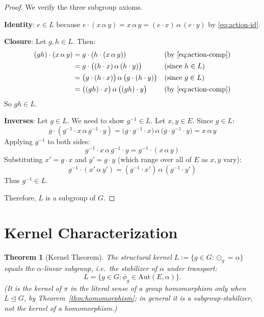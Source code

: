 \documentclass[11pt,a4paper,openany]{book}
\theoremstyle{plain}
\newtheorem{theorem}{Theorem}[chapter]
\theoremstyle{definition}
\newcommand{\twing}[1]{\odot_{#1}}
\newcommand{\lingroup}{L}
\newcommand{\actspace}{E}
\newcommand{\groupG}{G}
\newcommand{\Aut}{\mathrm{Aut}}
\begin{document}
\begin{proof}
We verify the three subgroup axioms.

\textbf{Identity}: $e \in \lingroup$ because $e \cdot (x \,\alpha\, y) = x \,\alpha\, y = (e \cdot x) \,\alpha\, (e \cdot y)$ by \eqref{eq:action-id}.
    
\textbf{Closure}: Let $g, h \in \lingroup$. Then:
\begin{align*}
    (gh) \cdot (x \,\alpha\, y) &= g \cdot (h \cdot (x \,\alpha\, y)) && \text{(by \eqref{eq:action-comp})} \\
    &= g \cdot \big((h \cdot x) \,\alpha\, (h \cdot y)\big) && \text{(since $h \in \lingroup$)} \\
    &= \big(g \cdot (h \cdot x)\big) \,\alpha\, \big(g \cdot (h \cdot y)\big) && \text{(since $g \in \lingroup$)} \\
    &= \big((gh) \cdot x\big) \,\alpha\, \big((gh) \cdot y\big) && \text{(by \eqref{eq:action-comp})}
\end{align*}
So $gh \in \lingroup$.
    
\textbf{Inverses}: Let $g \in \lingroup$. We need to show $g^{-1} \in \lingroup$. Let $x, y \in \actspace$. Since $g \in \lingroup$:
\[
g \cdot (g^{-1} \cdot x \,\alpha\, g^{-1} \cdot y) = \big(g \cdot g^{-1} \cdot x\big) \,\alpha\, \big(g \cdot g^{-1} \cdot y\big) = x \,\alpha\, y
\]
Applying $g^{-1}$ to both sides:
\[
g^{-1} \cdot x \,\alpha\, g^{-1} \cdot y = g^{-1} \cdot (x \,\alpha\, y)
\]
Substituting $x' = g \cdot x$ and $y' = g \cdot y$ (which range over all of $\actspace$ as $x,y$ vary):
\[
g^{-1} \cdot (x' \,\alpha\, y') = (g^{-1} \cdot x') \,\alpha\, (g^{-1} \cdot y')
\]
Thus $g^{-1} \in \lingroup$.

Therefore, $\lingroup$ is a subgroup of $\groupG$.
\end{proof}

\section{Kernel Characterization}

\begin{theorem}[Kernel Theorem]\label{thm:kernel}
The structural kernel $\lingroup := \{g\in\groupG:\twing{g}=\alpha\}$ equals the $\alpha$-linear subgroup, i.e.\ the stabilizer of $\alpha$ under transport:
\[
\lingroup = \{g\in\groupG : \phi_g \in \Aut(\actspace,\alpha)\}.
\]
(It is the kernel of $\pi$ in the literal sense of a group homomorphism only when $\lingroup\trianglelefteq\groupG$, by Theorem~\ref{thm:homomorphism}; in general it is a subgroup-stabilizer, not the kernel of a homomorphism.)
\end{theorem}
\end{document}
